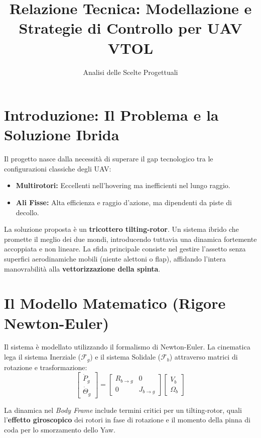 \documentclass[12pt,a4paper]{article}
\title{\textbf{Relazione Tecnica: Modellazione e Strategie di Controllo per UAV VTOL}}
\author{Analisi delle Scelte Progettuali}
\date{}
\begin{document}
\maketitle

\section{Introduzione: Il Problema e la Soluzione Ibrida}
Il progetto nasce dalla necessità di superare il gap tecnologico tra le configurazioni classiche degli UAV:
\begin{itemize}
    \item \textbf{Multirotori:} Eccellenti nell'hovering ma inefficienti nel lungo raggio.
    \item \textbf{Ali Fisse:} Alta efficienza e raggio d'azione, ma dipendenti da piste di decollo.
\end{itemize}

La soluzione proposta è un \textbf{tricottero tilting-rotor}. Un sistema ibrido che promette il meglio dei due mondi, introducendo tuttavia una dinamica fortemente accoppiata e non lineare. La sfida principale consiste nel gestire l'assetto senza superfici aerodinamiche mobili (niente alettoni o flap), affidando l'intera manovrabilità alla \textbf{vettorizzazione della spinta}.

\section{Il Modello Matematico (Rigore Newton-Euler)}
Il sistema è modellato utilizzando il formalismo di Newton-Euler. La cinematica lega il sistema Inerziale ($\mathcal{F}_g$) e il sistema Solidale ($\mathcal{F}_b$) attraverso matrici di rotazione e trasformazione:
\begin{equation}
\begin{bmatrix} \dot{P}_g \\ \dot{\Theta}_g \end{bmatrix} = \begin{bmatrix} R_{b \to g} & 0 \\ 0 & J_{b \to g} \end{bmatrix} \begin{bmatrix} V_b \\ \Omega_b \end{bmatrix}
\end{equation}

La dinamica nel \textit{Body Frame} include termini critici per un tilting-rotor, quali l'\textbf{effetto giroscopico} dei rotori in fase di rotazione e il momento della pinna di coda per lo smorzamento dello Yaw.
\end{document}
